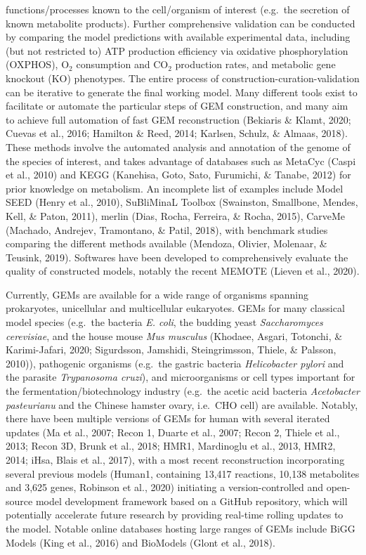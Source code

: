 \documentclass[12pt,twoside,openany,\mydriver]{thesis}  %
\begin{document}
functions/processes known to the cell/organism of interest (e.g.~the secretion of known metabolite products). Further comprehensive validation can be conducted by comparing the model predictions with available experimental data, including (but not restricted to) ATP production efficiency via oxidative phosphorylation (OXPHOS), \(\mathrm{O_2}\) consumption and \(\mathrm{CO_2}\) production rates, and metabolic gene knockout (KO) phenotypes. The entire process of construction-curation-validation can be iterative to generate the final working model. Many different tools exist to facilitate or automate the particular steps of GEM construction, and many aim to achieve full automation of fast GEM reconstruction (Bekiaris \& Klamt, 2020; Cuevas et al., 2016; Hamilton \& Reed, 2014; Karlsen, Schulz, \& Almaas, 2018). These methods involve the automated analysis and annotation of the genome of the species of interest, and takes advantage of databases such as MetaCyc (Caspi et al., 2010) and KEGG (Kanehisa, Goto, Sato, Furumichi, \& Tanabe, 2012) for prior knowledge on metabolism. An incomplete list of examples include Model SEED (Henry et al., 2010), SuBliMinaL Toolbox (Swainston, Smallbone, Mendes, Kell, \& Paton, 2011), merlin (Dias, Rocha, Ferreira, \& Rocha, 2015), CarveMe (Machado, Andrejev, Tramontano, \& Patil, 2018), with benchmark studies comparing the different methods available (Mendoza, Olivier, Molenaar, \& Teusink, 2019). Softwares have been developed to comprehensively evaluate the quality of constructed models, notably the recent MEMOTE (Lieven et al., 2020).

Currently, GEMs are available for a wide range of organisms spanning prokaryotes, unicellular and multicellular eukaryotes. GEMs for many classical model species (e.g.~the bacteria \emph{E. coli}, the budding yeast \emph{Saccharomyces cerevisiae}, and the house mouse \emph{Mus musculus} (Khodaee, Asgari, Totonchi, \& Karimi-Jafari, 2020; Sigurdsson, Jamshidi, Steingrimsson, Thiele, \& Palsson, 2010)), pathogenic organisms (e.g.~the gastric bacteria \emph{Helicobacter pylori} and the parasite \emph{Trypanosoma cruzi}), and microorganisms or cell types important for the fermentation/biotechnology industry (e.g.~the acetic acid bacteria \emph{Acetobacter pasteurianu} and the Chinese hamster ovary, i.e.~CHO cell) are available. Notably, there have been multiple versions of GEMs for human with several iterated updates (Ma et al., 2007; Recon 1, Duarte et al., 2007; Recon 2, Thiele et al., 2013; Recon 3D, Brunk et al., 2018; HMR1, Mardinoglu et al., 2013, HMR2, 2014; iHsa, Blais et al., 2017), with a most recent reconstruction incorporating several previous models (Human1, containing 13,417 reactions, 10,138 metabolites and 3,625 genes, Robinson et al., 2020) initiating a version-controlled and open-source model development framework based on a GitHub repository, which will potentially accelerate future research by providing real-time rolling updates to the model. Notable online databases hosting large ranges of GEMs include BiGG Models (King et al., 2016) and BioModels (Glont et al., 2018).
\end{document}
